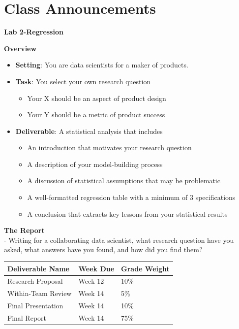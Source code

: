 \documentclass[
  letterpaper,
  DIV=11,
  numbers=noendperiod]{scrreprt}
\providecommand{\tightlist}{%
  \setlength{\itemsep}{0pt}\setlength{\parskip}{0pt}}\usepackage{longtable,booktabs,array}
\begin{document}
\section{Class Announcements}\label{class-announcements-9}

\textbf{Lab 2-Regression}

\textbf{Overview}

\begin{itemize}
\tightlist
\item
  \textbf{Setting}: You are data scientists for a maker of products.
\item
  \textbf{Task}: You select your own research question

  \begin{itemize}
  \tightlist
  \item
    Your X should be an aspect of product design
  \item
    Your Y should be a metric of product success
  \end{itemize}
\item
  \textbf{Deliverable}: A statistical analysis that includes

  \begin{itemize}
  \tightlist
  \item
    An introduction that motivates your research question
  \item
    A description of your model-building process
  \item
    A discussion of statistical assumptions that may be problematic
  \item
    A well-formatted regression table with a minimum of 3 specifications
  \item
    A conclusion that extracts key lessons from your statistical results
  \end{itemize}
\end{itemize}

\textbf{The Report}\\
- Writing for a collaborating data scientist, what research question
have you asked, what answers have you found, and how did you find them?

\begin{longtable}[]{@{}lll@{}}
\toprule\noalign{}
Deliverable Name & Week Due & Grade Weight \\
\midrule\noalign{}
\endhead
\bottomrule\noalign{}
\endlastfoot
Research Proposal & Week 12 & 10\% \\
Within-Team Review & Week 14 & 5\% \\
Final Presentation & Week 14 & 10\% \\
Final Report & Week 14 & 75\% \\
\end{longtable}
\end{document}
